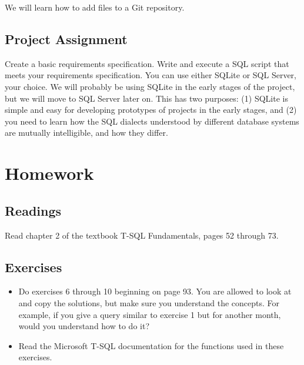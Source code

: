 \documentclass{article}
\begin{document}
        We will learn how to add files to a Git repository.

        \subsection{Project Assignment}

        Create a basic requirements specification. Write and execute a SQL script that meets your requirements specification. You can use either SQLite or SQL Server, your choice. We will probably be using SQLite in the early stages of the project, but we will move to SQL Server later on. This has two purposes: (1) SQLite is simple and easy for developing prototypes of projects in the early stages, and (2) you need to learn how the SQL dialects understood by different database systems are mutually intelligible, and how they differ.

    \section{Homework}


        \subsection{Readings}
         Read chapter 2 of the textbook T-SQL Fundamentals, pages 52 through 73.

        
        \subsection{Exercises}

        \begin{itemize}
        \item Do exercises 6 through 10 beginning on page 93. You are allowed to look at and copy the solutions, but make sure you understand the concepts. For example, if you give a query similar to exercise 1 but for another month, would you understand how to do it?

        \item Read the Microsoft T-SQL documentation for the functions used in these exercises.
        \end{itemize}
\end{document}
